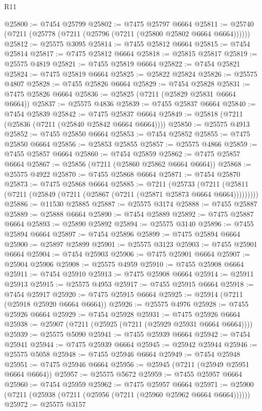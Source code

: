 \begin{lexlean}{R11}
\begin{coremodule}
@25800 := @7454 @25799
@25802 := @7475 @25797 @6664
@25811 := @25740 (@7211 (@25778 (@7211 (@25796 (@7211 (@25800 @25802 @6664 @6664))))))
@25812 := @25575 @3095
@25814 := @7455 @25812 @6664
@25815 := @7454 @25814
@25817 := @7475 @25812 @6664
@25818 := @25815 @25817
@25819 := @25575 @4819
@25821 := @7455 @25819 @6664
@25822 := @7454 @25821
@25824 := @7475 @25819 @6664
@25825 := @25822 @25824
@25826 := @25575 @4807
@25828 := @7455 @25826 @6664
@25829 := @7454 @25828
@25831 := @7475 @25826 @6664
@25836 := @25825 (@7211 (@25829 @25831 @6664 @6664))
@25837 := @25575 @4836
@25839 := @7455 @25837 @6664
@25840 := @7454 @25839
@25842 := @7475 @25837 @6664
@25849 := @25818 (@7211 (@25836 (@7211 (@25840 @25842 @6664 @6664))))
@25850 := @25575 @4913
@25852 := @7455 @25850 @6664
@25853 := @7454 @25852
@25855 := @7475 @25850 @6664
@25856 := @25853 @25855
@25857 := @25575 @4866
@25859 := @7455 @25857 @6664
@25860 := @7454 @25859
@25862 := @7475 @25857 @6664
@25867 := @25856 (@7211 (@25860 @25862 @6664 @6664))
@25868 := @25575 @4922
@25870 := @7455 @25868 @6664
@25871 := @7454 @25870
@25873 := @7475 @25868 @6664
@25885 := @7211
    (@25733 (@7211 (@25811 (@7211 (@25849 (@7211 (@25867 (@7211 (@25871 @25873 @6664 @6664)))))))))
@25886 := @11530 @25885
@25887 := @25575 @3174
@25888 := @7455 @25887
@25889 := @25888 @6664
@25890 := @7454 @25889
@25892 := @7475 @25887 @6664
@25893 := @25890 @25892
@25894 := @25575 @3140
@25896 := @7455 @25894 @6664
@25897 := @7454 @25896
@25899 := @7475 @25894 @6664
@25900 := @25897 @25899
@25901 := @25575 @3123
@25903 := @7455 @25901 @6664
@25904 := @7454 @25903
@25906 := @7475 @25901 @6664
@25907 := @25904 @25906
@25908 := @25575 @4959
@25910 := @7455 @25908 @6664
@25911 := @7454 @25910
@25913 := @7475 @25908 @6664
@25914 := @25911 @25913
@25915 := @25575 @4953
@25917 := @7455 @25915 @6664
@25918 := @7454 @25917
@25920 := @7475 @25915 @6664
@25925 := @25914 (@7211 (@25918 @25920 @6664 @6664))
@25926 := @25575 @4976
@25928 := @7455 @25926 @6664
@25929 := @7454 @25928
@25931 := @7475 @25926 @6664
@25938 := @25907 (@7211 (@25925 (@7211 (@25929 @25931 @6664 @6664))))
@25939 := @25575 @5090
@25941 := @7455 @25939 @6664
@25942 := @7454 @25941
@25944 := @7475 @25939 @6664
@25945 := @25942 @25944
@25946 := @25575 @5058
@25948 := @7455 @25946 @6664
@25949 := @7454 @25948
@25951 := @7475 @25946 @6664
@25956 := @25945 (@7211 (@25949 @25951 @6664 @6664))
@25957 := @25575 @5672
@25959 := @7455 @25957 @6664
@25960 := @7454 @25959
@25962 := @7475 @25957 @6664
@25971 := @25900 (@7211 (@25938 (@7211 (@25956 (@7211 (@25960 @25962 @6664 @6664))))))
@25972 := @25575 @3157

\end{coremodule}
\end{lexlean}
